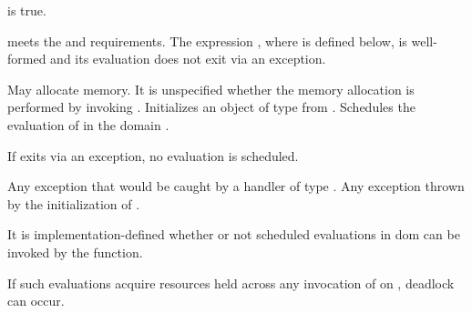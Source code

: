 \begin{itemdescr}

\mandates
{} is true.

\expects
{} meets the  and
 requirements.
The expression , where  is defined below, is
well-formed and its evaluation does not exit via an exception.

\effects
May allocate memory.
It is unspecified whether the memory allocation is performed by
invoking  .
Initializes an object  of type  from
.
Schedules the evaluation of  in the domain
.
\begin{note}
If  exits via an exception, no evaluation
is scheduled.\end{note}

\throws
Any exception that would be caught by a handler of type
.
Any exception thrown by the initialization of .

\remarks
It is implementation-defined whether or not scheduled
evaluations in dom can be invoked by the 
function.
\begin{note}
If such evaluations acquire resources held across any invocation
of  on , deadlock can occur.\end{note}

\end{itemdescr}
